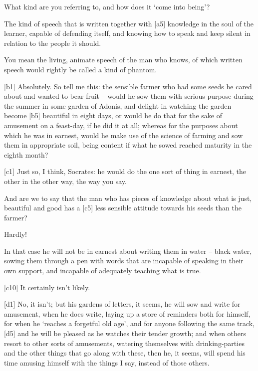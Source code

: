  What kind are you referring to, and how does it ‘come into
being'?

 The kind of speech that is written together with {[}a5{]}
knowledge in the soul of the learner, capable of defending itself, and
knowing how to speak and keep silent in relation to the people it
should.

 You mean the living,
animate speech of the
man who knows, of which written speech would rightly be called a kind of
phantom.

{[}b1{]}  Absolutely. So tell me this: the sensible farmer who
had some seeds he cared about and wanted to bear fruit -- would he sow
them with serious purpose during the summer in some garden of
Adonis, and delight in
watching the garden become {[}b5{]} beautiful in eight days, or would he
do that for the sake of amusement on a feast-day, if he did it at all;
whereas for the purposes about which he was in earnest, would he make
use of the science of farming and sow them in appropriate soil, being
content if what he sowed reached maturity in the eighth month?

{[}c1{]}  Just so, I think, Socrates: he would do the one sort
of thing in earnest, the other in the other way, the way you say.

 And are we to say that the man who has pieces of
knowledge about what is
just, beautiful and good
has a {[}c5{]} less sensible attitude towards his seeds than the farmer?

 Hardly!

 In that case he will not be in earnest about writing them in
water -- black water, sowing them through a pen with words that are
incapable of speaking in their own support, and incapable of adequately
teaching what is true.

{[}c10{]}  It certainly isn't likely.

{[}d1{]}  No, it isn't; but his gardens of letters, it seems, he
will sow and write for amusement, when he does write, laying up a store
of reminders both for himself, for when he ‘reaches a forgetful old
age', and for anyone
following the same track, {[}d5{]} and he will be pleased as he watches
their tender growth; and when others resort to other sorts of
amusements, watering themselves with drinking-parties and the other
things that go along with these, then he, it seems, will spend his time
amusing himself with the things I say, instead of those others.

